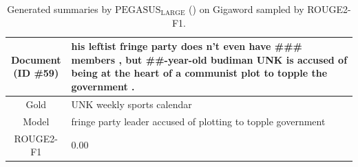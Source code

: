 \begin{table}[bth!]
\begin{tabular}{c|p{}}
\makecell{Document\\(ID \#59)} & 
his leftist fringe party does n't even have \#\#\# members , but \#\#-year-old budiman UNK is accused of being at the heart of a communist plot to topple the government .
\\ \hline
Gold & 
UNK weekly sports calendar
\\ \hline
Model & 
fringe party leader accused of plotting to topple government
\\ \hline
ROUGE2-F1 & 
0.00
\\ \hline
\end{tabular}
\caption{Generated summaries by $\text{PEGASUS}_{\text{LARGE}}$ (\gnews) on Gigaword sampled by ROUGE2-F1.}
\end{table}
